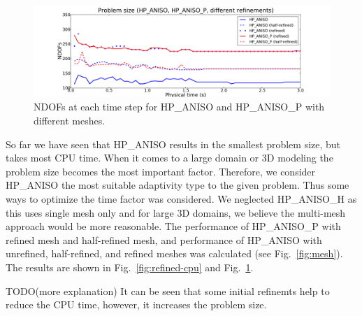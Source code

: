 \begin{figure}
  \begin{centering}
  \includegraphics[width=\columnwidth]{refined_dof}
  \caption{\label{fig:refined-dof} NDOFs at each time step for
  HP\_ANISO and HP\_ANISO\_P with different meshes.}
  \end{centering}
\end{figure}

So far we have seen that HP\_ANISO results in the smallest problem size, but takes
most CPU time. When it comes to a large domain or 3D modeling the problem
size becomes the most important factor. Therefore, we consider HP\_ANISO the most
suitable adaptivity type to the given problem. Thus some ways to optimize the time
factor was considered. We neglected HP\_ANISO\_H as this uses single mesh only
and for large 3D domains, we believe the multi-mesh approach would be
more reasonable. The performance of HP\_ANISO\_P with refined mesh and half-refined
mesh, and performance of HP\_ANISO with unrefined, half-refined, and refined
meshes was calculated (see Fig.~\ref{fig:mesh}).
The results are shown in Fig.~\ref{fig:refined-cpu} and Fig.~\ref{fig:refined-dof}.

TODO(more explanation) It can be seen that some initial refinemts help to reduce the CPU time,
however, it increases the problem size.
